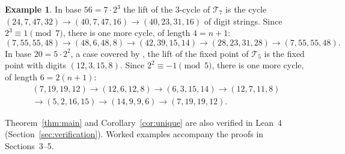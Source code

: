 \documentclass[11pt]{amsart}
\theoremstyle{definition}
\newtheorem*{example}{Example}
\theoremstyle{remark}
\newcommand{\T}{\mathcal{T}}
\begin{document}
\begin{example}
In base $56=7\cdot2^3$ the lift of the $3$-cycle of $\T_7$ is the cycle $(24,7,47,32)\to(40,7,47,16)\to(40,23,31,16)$ of digit strings. Since $2^3\equiv1\pmod7$, there is one more cycle, of length $4=n+1$:
\[
(7,55,55,48)\to(48,6,48,8)\to(42,39,15,14)\to(28,23,31,28)\to(7,55,55,48).
\]
In base $20=5\cdot2^2$, a case covered by \cite{HP}, the lift of the fixed point of $\T_5$ is the fixed point with digits $(12,3,15,8)$. Since $2^2\equiv-1\pmod5$, there is one more cycle, of length $6=2(n+1)$:
\begin{multline*}
(7,19,19,12)\to(12,6,12,8)\to(6,3,15,14)\to(12,7,11,8)\\
\to(5,2,16,15)\to(14,9,9,6)\to(7,19,19,12).
\end{multline*}
\end{example}

Theorem~\ref{thm:main} and Corollary~\ref{cor:unique} are also verified in Lean~4 (Section~\ref{sec:verification}). Worked examples accompany the proofs in Sections~3--5.
\end{document}
